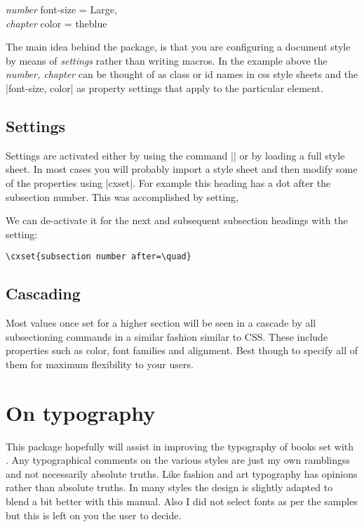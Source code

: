\begin{scriptexample}{}{}
\textit{number} font-size = Large,\\
\textit{chapter} color = theblue
\end{scriptexample}
\smallskip

The main idea behind the package, is that you are configuring a document style by means of \emph{settings} rather than writing macros. In the example above the \emph{number, chapter} can be thought of as class or id names in css style sheets and the |font-size, color| as property settings that apply to the particular element. 


\subsection{Settings}

Settings are activated either by using the command |\cxset|  or by loading a full style sheet. In most cases you will probably import a style sheet and then modify some of the properties using |cxset|.  For example this heading has a dot after the subsection number. This was accomplished by setting,

We can de-activate it for the next and subsequent subsection headings with the setting:

\begin{scriptexample}{}{}
\begin{verbatim}
\cxset{subsection number after=\quad}
\end{verbatim}
\end{scriptexample}



\subsection{Cascading}

Most values once set for a higher section will be seen in a cascade by all subsectioning commands in a similar fashion similar to CSS. These include properties such as color, font families and alignment. Best though to specify all of them for maximum flexibility to your users.

\section{On typography}

This package hopefully will assist in improving the typography of books set with \latexe. Any typographical comments on the various styles are just my own ramblingss and not necessarily absolute truths. Like fashion and art typography has opinions rather than absolute truths. In many styles the design is slightly adapted to blend a bit better with this manual. Also I did not select fonts as per the samples but this is left on you the user to decide.



